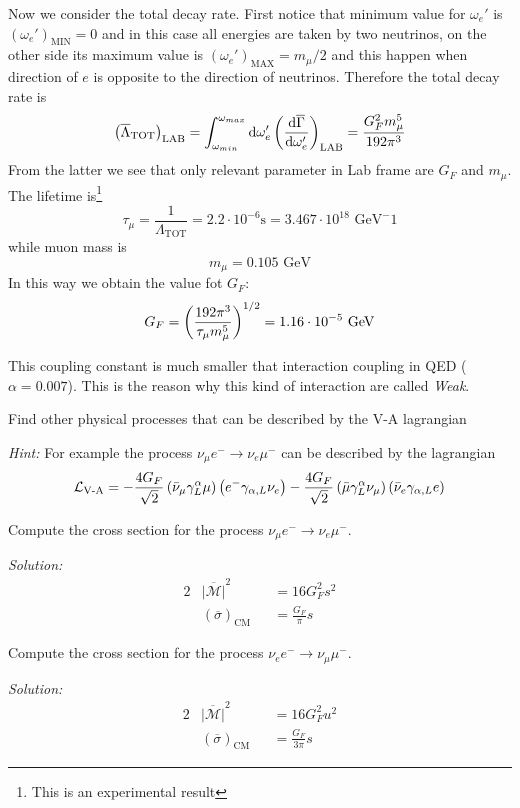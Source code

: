 \documentclass[TheoreticalPhy_ModB.tex]{subfiles}
\begin{document}
Now we consider the total decay rate. First notice that minimum value for $\omega_e'$ is $(\omega_e')_{\text{MIN}}=0$ and in this case all energies are taken by two neutrinos, on the other side its maximum value is $(\omega_e')_{\text{MAX}}=m_\mu/2$ and this happen when direction of $e$ is opposite to the direction of neutrinos. Therefore the total decay rate is
\[\left(\overline{\Lambda}_{\text{TOT}}\right)_{\text{LAB}}=\int_{\omega_{min}}^{\omega_{max}}\textup{d}\omega_e'\left(\frac{\textup{d}\overline\Gamma}{\textup{d}\omega_e'}\right)_{\text{LAB}}
=\frac{G_F^2m_\mu^5}{192\pi^3}\]
From the latter we see that only relevant parameter in Lab frame are $G_F$ and $m_\mu$. The lifetime is\footnote{This is an experimental result}
\[\tau_\mu=\frac1{\Lambda_{\text{TOT}}}=2.2\cdot 10^{-6}\text{s}
=3.467\cdot 10^{18}\text{ GeV}^-1\]
while muon mass is 
\[m_\mu=0.105\text{ GeV}\]
In this way we obtain the value fot $G_F$:
\[G_F=\left(\frac{192\pi^3}{\tau_\mu m_\mu^5}\right)^{1/2}=1.16\cdot 10^{-5}\text{ GeV}\]

This coupling constant is much smaller that interaction coupling in QED ($\alpha=0.007$). This is the reason why this kind of interaction are called \emph{Weak}.

\begin{exercise}
Find other physical processes that can be described by the V-A lagrangian

\skipline
\textit{Hint:}
For example the process $\nu_\mu e^-\to\nu_e\mu^-$ can be described by the lagrangian
\[\mathcal L_{\text{V-A}}=-\frac{4G_F}{\sqrt2}\left(\bar\nu_\mu\gamma^\alpha_L\mu\right)\left(e^-\gamma_{\alpha,L}\nu_e\right)-\frac{4G_F}{\sqrt2}\left(\bar\mu\gamma^\alpha_L\nu_\mu\right)\left(\bar\nu_e\gamma_{\alpha,L}e\right)\]
\end{exercise}


\begin{exercise}
Compute the cross section for the process $\nu_\mu e^-\to\nu_e\mu^-$.

\skipline
\textit{Solution:}
\begin{alignat*}{2}
&\overline{|\mathcal M|}^2&&=16G_F^2s^2\\
&(\overline\sigma)_{\text{CM}}&&=\frac{G_F}{\pi}s
\end{alignat*}
\end{exercise}

\begin{exercise}
Compute the cross section for the process $\nu_e e^-\to\nu_\mu\mu^-$.

\skipline
\textit{Solution:}
\begin{alignat*}{2}
&\overline{|\mathcal M|}^2&&=16G_F^2u^2\\
&(\overline\sigma)_{\text{CM}}&&=\frac{G_F}{3\pi}s
\end{alignat*}
\end{exercise}
\end{document}
